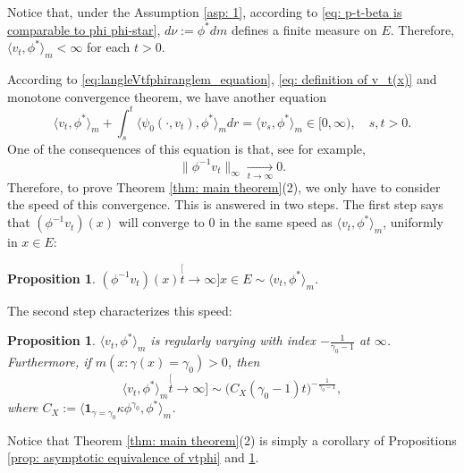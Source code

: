 \documentclass[12pt, a4paper]{amsart}
\newtheorem{prop}[thm]{Proposition}
\theoremstyle{definition}
\numberwithin{equation}{section}
\begin{document}
		Notice that,
	under the Assumption \ref{asp: 1}, according to \eqref{eq: p-t-beta is comparable to phi phi-star}, $d\nu:= \phi^* dm$ defines a finite measure on $E$.
	Therefore, $\langle v_t, \phi^*\rangle_m < \infty$ for each $t>0$.

	According to \eqref{eq:langleVtfphiranglem_equation}, \eqref{eq: definition of v_t(x)} and monotone convergence theorem,
	we have another equation
\[ \label{eq: equation of <vt,phi>}
	 \langle v_t,\phi^*\rangle_m + \int_s^t \langle \psi_0(\cdot ,v_t) , \phi^*\rangle_m dr
	= \langle v_s,\phi^*\rangle_m
	\in [0,\infty),
	\quad s, t > 0.
\]
	One of the consequences of this equation is that, see \cite[Lemma 5.1]{RenSongSun2017Spine} for example,
\[\label{eq: uniform converges to 0}
    \|\phi^{-1}v_t\|_{\infty} \xrightarrow[t\to \infty]{} 0.
\]
	Therefore, to prove Theorem \ref{thm: main theorem}(2), we only have to consider the speed of this convergence.
	This is answered in two steps.
	The first step says that $(\phi^{-1}v_t)(x)$ will converge to $0$ in the same speed as $\langle v_t,\phi^*\rangle_m $, uniformly in $x\in E$:

\begin{prop}
\label{prop: convergence in a same speed}
	$(\phi^{-1}v_t)(x) \stackrel[t\to\infty]{x\in E}{\sim} \langle v_t,\phi^*\rangle_m$.
\end{prop}
\label{prop: asymptotic equivalence of vtphi}
	The second step characterizes this speed:
\begin{prop}
\label{prop: regularly varying of vt-phi-star}
	$\langle v_t,\phi^*\rangle_m $ is regularly varying with index $-\frac{1}{\gamma_0-1}$ at $\infty$.
	Furthermore, if $m(x: \gamma (x)= \gamma_0)>0$, then
\[
	\langle v_t,\phi^*\rangle_m
	\stackrel[t\to \infty]{}{\sim} \big(C_X(\gamma_0-1) t \big)^{-\frac{1}{\gamma_0 - 1}},
\]
	where $C_X:= \langle \mathbf 1_{\gamma= \gamma_0} \kappa \phi^{\gamma_0}, \phi^* \rangle_m $.
\end{prop}

	Notice that
	Theorem \ref{thm: main theorem}(2) is simply a corollary of Propositions \ref{prop: asymptotic equivalence of vtphi} and \ref{prop: regularly varying of vt-phi-star}.
\end{document}
